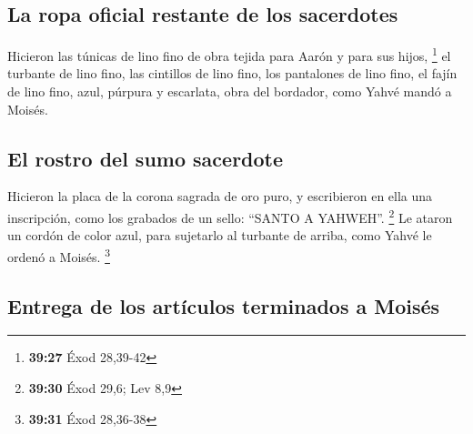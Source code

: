 \hypertarget{la-ropa-oficial-restante-de-los-sacerdotes}{%
\subsection{La ropa oficial restante de los
sacerdotes}\label{la-ropa-oficial-restante-de-los-sacerdotes}}

 Hicieron las túnicas de lino fino de obra tejida para
Aarón y para sus hijos, \footnote{\textbf{39:27} Éxod 28,39-42}
 el turbante de lino fino, las cintillos de lino fino,
los pantalones de lino fino,  el fajín de lino fino,
azul, púrpura y escarlata, obra del bordador, como Yahvé mandó a Moisés.

\hypertarget{el-rostro-del-sumo-sacerdote}{%
\subsection{El rostro del sumo
sacerdote}\label{el-rostro-del-sumo-sacerdote}}

 Hicieron la placa de la corona sagrada de oro puro, y
escribieron en ella una inscripción, como los grabados de un sello:
``SANTO A YAHWEH''. \footnote{\textbf{39:30} Éxod 29,6; Lev 8,9}
 Le ataron un cordón de color azul, para sujetarlo al
turbante de arriba, como Yahvé le ordenó a Moisés. \footnote{\textbf{39:31}
  Éxod 28,36-38}

\hypertarget{entrega-de-los-artuxedculos-terminados-a-moisuxe9s}{%
\subsection{Entrega de los artículos terminados a
Moisés}\label{entrega-de-los-artuxedculos-terminados-a-moisuxe9s}}


